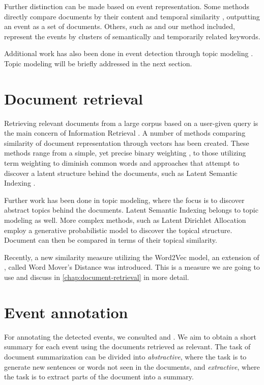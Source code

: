 Further distinction can be made based on event representation. Some methods directly compare documents by their content and temporal similarity \citep{document-bursty-representation}, outputting an event as a set of documents. Others, such as \cite{parameter-free, event-detection, health-events} and our method included, represent the events by clusters of semantically and temporarily related keywords.

Additional work has also been done in event detection through topic modeling \citep{chaney, keane}. Topic modeling will be briefly addressed in the next section.

\section{Document retrieval}
Retrieving relevant documents from a large corpus based on a user-given query is the main concern of Information Retrieval \citep{information-retrieval-2, information-retrieval}. A number of methods comparing similarity of document representation through vectors has been created. These methods range from a simple, yet precise binary weighting \citep{luhn, salton, information-retrieval}, to those utilizing term weighting to diminish common words \citep{tfidf} and approaches that attempt to discover a latent structure behind the documents, such as Latent Semantic Indexing \citep{lsi}.

Further work has been done in topic modeling, where the focus is to discover abstract topics behind the documents. Latent Semantic Indexing belongs to topic modeling as well. More complex methods, such as Latent Dirichlet Allocation \citep{lda} employ a generative probabilistic model to discover the topical structure. Document can then be compared in terms of their topical similarity.

Recently, a new similarity measure utilizing the Word2Vec model, an extension of \cite{emd}, called Word Mover's Distance \citep{wmd} was introduced. This is a measure we are going to use and discuss in \autoref{chap:document-retrieval} in more detail.

\section{Event annotation}
For annotating the detected events, we consulted \cite{summarization-survey-1} and \cite{summarization-survey-2}. We aim to obtain a short summary for each event using the documents retrieved as relevant. The task of document summarization can be divided into \textit{abstractive}, where the task is to generate new sentences or words not seen in the documents, and \textit{extractive}, where the task is to extract parts of the document into a summary.

